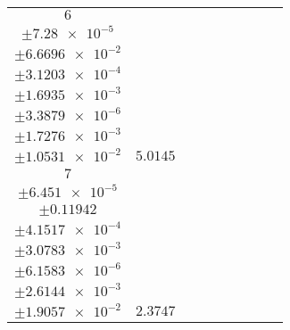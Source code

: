 \documentclass[8pt]{article}
\begin{document}
\begin{longtable}[l]{c c c c c c c c c}
$\num{6}$ & \begin{tabular}[c]{@{}c@{}}$\num{6.552e-2}$ \\ $\pm\num{7.28e-5}$\end{tabular} & \begin{tabular}[c]{@{}c@{}}$\num{0.2367}$ \\ $\pm\num{6.6696e-2}$\end{tabular} & \begin{tabular}[c]{@{}c@{}}$\num{7.1739}$ \\ $\pm\num{3.1203e-4}$\end{tabular} & \begin{tabular}[c]{@{}c@{}}$\num{1.1869e+3}$ \\ $\pm\num{1.6935e-3}$\end{tabular} & \begin{tabular}[c]{@{}c@{}}$\num{2.3745}$ \\ $\pm\num{3.3879e-6}$\end{tabular} & \begin{tabular}[c]{@{}c@{}}$\num{1.565}$ \\ $\pm\num{1.7276e-3}$\end{tabular} & \begin{tabular}[c]{@{}c@{}}$\num{4.2908}$ \\ $\pm\num{1.0531e-2}$\end{tabular} & $\num{5.0145}$\\
$\num{7}$ & \begin{tabular}[c]{@{}c@{}}$\num{3.1202e-2}$ \\ $\pm\num{6.451e-5}$\end{tabular} & \begin{tabular}[c]{@{}c@{}}$\num{0.62207}$ \\ $\pm\num{0.11942}$\end{tabular} & \begin{tabular}[c]{@{}c@{}}$\num{11.393}$ \\ $\pm\num{4.1517e-4}$\end{tabular} & \begin{tabular}[c]{@{}c@{}}$\num{1.1912e+3}$ \\ $\pm\num{3.0783e-3}$\end{tabular} & \begin{tabular}[c]{@{}c@{}}$\num{2.383}$ \\ $\pm\num{6.1583e-6}$\end{tabular} & \begin{tabular}[c]{@{}c@{}}$\num{1.1836}$ \\ $\pm\num{2.6144e-3}$\end{tabular} & \begin{tabular}[c]{@{}c@{}}$\num{4.2266}$ \\ $\pm\num{1.9057e-2}$\end{tabular} & $\num{2.3747}$\\
\bottomrule
\end{longtable}
\end{document}
